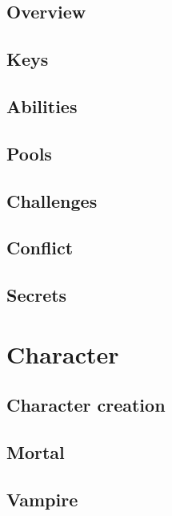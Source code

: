 \documentclass[a4paper, 12pt, finnish]{article}
\begin{document}
	\subsection{Overview}\label{ssec:overview}
		
	\subsection{Keys}\label{ssec:keys}
		
	\subsection{Abilities}\label{ssec:abilities}
		
	\subsection{Pools}\label{ssec:pools}
		
	\subsection{Challenges}\label{ssec:challenges} %
		
	\subsection{Conflict}\label{ssec:conflict} %
		
	\subsection{Secrets}\label{ssec:secrets}
		
\section{Character}
	\subsection{Character creation}\label{ssec:creation}
		
	\subsection{Mortal}\label{ssec:mortal}
		
	\subsection{Vampire}\label{ssec:vampire} %
		
\end{document}
